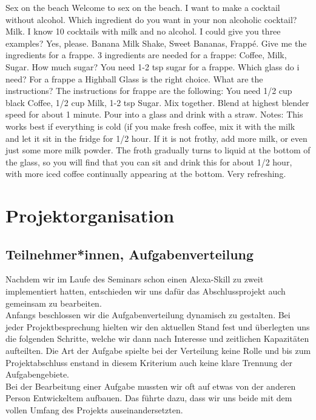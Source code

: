 \documentclass[12pt,letterpaper]{article}
\begin{document}
\begin{dialogue}
	 Sex on the beach
	 Welcome to sex on the beach.
	 I want to make a cocktail without alcohol.
	 Which ingredient do you want in your non alcoholic cocktail?
	 Milk.
	 I know 10 cocktails with milk and no alcohol. I could give you three examples?
	 Yes, please.
	 Banana Milk Shake, Sweet Bananas, Frappé.
	 Give me the ingredients for a frappe.
	 3 ingredients are needed for a frappe: Coffee, Milk, Sugar.
	 How much sugar?
	 You need 1-2 tsp sugar for a frappe.
	 Which glass do i need?
	 For a frappe a Highball Glass is the right choice.
	 What are the instructions?
	 The instructions for frappe are the following: You need 1/2 cup black Coffee, 1/2 cup Milk, 1-2 tsp Sugar. Mix together. Blend at highest blender speed for about 1 minute. Pour into a glass and drink with a straw. Notes: This works best if everything is cold (if you make fresh coffee, mix it with the milk and let it sit in the fridge for 1/2 hour. If it is not frothy, add more milk, or even just some more milk powder. The froth gradually turns to liquid at the bottom of the glass, so you will find that you can sit and drink this for about 1/2 hour, with more iced coffee continually appearing at the bottom. Very refreshing.
	
\end{dialogue}

\section{Projektorganisation}
\subsection{Teilnehmer*innen, Aufgabenverteilung}
Nachdem wir im Laufe des Seminars schon einen Alexa-Skill zu zweit implementiert hatten, entschieden wir uns dafür das Abschlussprojekt auch gemeinsam zu bearbeiten. \\
Anfangs beschlossen wir die Aufgabenverteilung dynamisch zu gestalten. Bei jeder Projektbesprechung hielten wir den aktuellen Stand fest und überlegten uns die folgenden Schritte, welche wir dann nach Interesse und zeitlichen Kapazitäten aufteilten. Die Art der Aufgabe spielte bei der Verteilung keine Rolle und bis zum Projektabschluss enstand in diesem Kriterium auch keine klare Trennung der Aufgabengebiete.  \\ Bei der Bearbeitung einer Aufgabe mussten wir oft auf etwas von der anderen Person Entwickeltem aufbauen. Das führte dazu, dass wir uns beide mit dem vollen Umfang des Projekts auseinandersetzten. 
\end{document}
